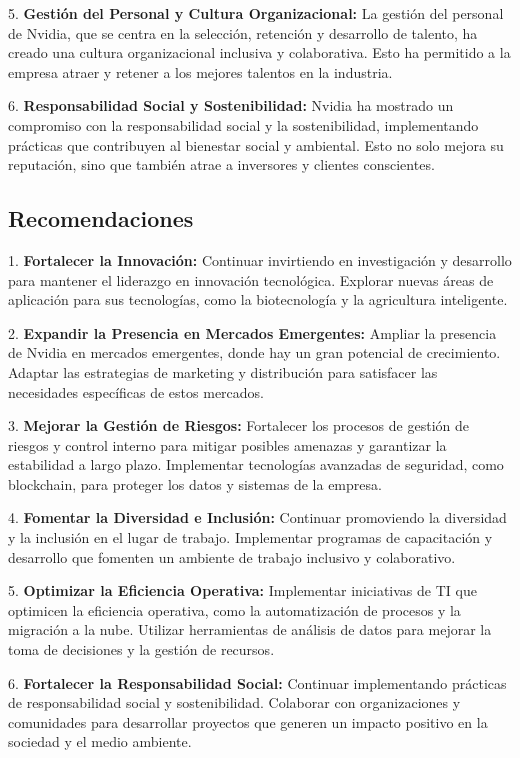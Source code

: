 \documentclass{article}
\begin{document}
5. \textbf{Gestión del Personal y Cultura Organizacional:} La gestión del personal de Nvidia, que se centra en la selección, retención y desarrollo de talento, ha creado una cultura organizacional inclusiva y colaborativa. Esto ha permitido a la empresa atraer y retener a los mejores talentos en la industria.

6. \textbf{Responsabilidad Social y Sostenibilidad:} Nvidia ha mostrado un compromiso con la responsabilidad social y la sostenibilidad, implementando prácticas que contribuyen al bienestar social y ambiental. Esto no solo mejora su reputación, sino que también atrae a inversores y clientes conscientes.

\subsection{Recomendaciones}

1. \textbf{Fortalecer la Innovación:} Continuar invirtiendo en investigación y desarrollo para mantener el liderazgo en innovación tecnológica. Explorar nuevas áreas de aplicación para sus tecnologías, como la biotecnología y la agricultura inteligente.

2. \textbf{Expandir la Presencia en Mercados Emergentes:} Ampliar la presencia de Nvidia en mercados emergentes, donde hay un gran potencial de crecimiento. Adaptar las estrategias de marketing y distribución para satisfacer las necesidades específicas de estos mercados.

3. \textbf{Mejorar la Gestión de Riesgos:} Fortalecer los procesos de gestión de riesgos y control interno para mitigar posibles amenazas y garantizar la estabilidad a largo plazo. Implementar tecnologías avanzadas de seguridad, como blockchain, para proteger los datos y sistemas de la empresa.

4. \textbf{Fomentar la Diversidad e Inclusión:} Continuar promoviendo la diversidad y la inclusión en el lugar de trabajo. Implementar programas de capacitación y desarrollo que fomenten un ambiente de trabajo inclusivo y colaborativo.

5. \textbf{Optimizar la Eficiencia Operativa:} Implementar iniciativas de TI que optimicen la eficiencia operativa, como la automatización de procesos y la migración a la nube. Utilizar herramientas de análisis de datos para mejorar la toma de decisiones y la gestión de recursos.

6. \textbf{Fortalecer la Responsabilidad Social:} Continuar implementando prácticas de responsabilidad social y sostenibilidad. Colaborar con organizaciones y comunidades para desarrollar proyectos que generen un impacto positivo en la sociedad y el medio ambiente.
\end{document}
